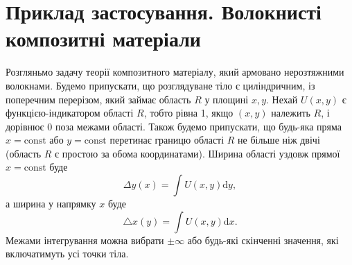 \documentclass[14pt,twoside]{extreport}
\theoremstyle{mystyle}
\numberwithin{equation}{chapter}
\begin{document}
\section{Приклад застосування. Волокнисті композитні матеріали}

Розгляньмо задачу теорії композитного матеріалу, який армовано нерозтяжними волокнами. Будемо припускати, що розглядуване тіло є циліндричним, із поперечним перерізом, який займає область $R$ у площині $x, y$. Нехай $U(x, y)$ є функцією-індикатором області $R$, тобто рівна 1, якщо $(x, y)$ належить $R$, і дорівнює $0$ поза межами області. Також будемо припускати, що будь-яка пряма $x=\textrm{const}$ або $y=\textrm{const}$ перетинає границю області $R$ не більше ніж двічі (область $R$ є простою за обома координатами). Ширина області уздовж прямої $x=\textrm{const}$ буде
\begin{equation}\label{comp1}
	\displaystyle \Delta y(x)=\int U(x, y)\mathrm{d}y,
\end{equation}
а ширина у напрямку $x$ буде
\begin{equation}\label{comp2}
	\displaystyle \triangle x(y)=\int U(x, y)\mathrm{d}x.
\end{equation}
Межами інтегрування можна вибрати $\pm\infty$ або будь-які скінченні значення, які включатимуть усі точки тіла.
\end{document}
